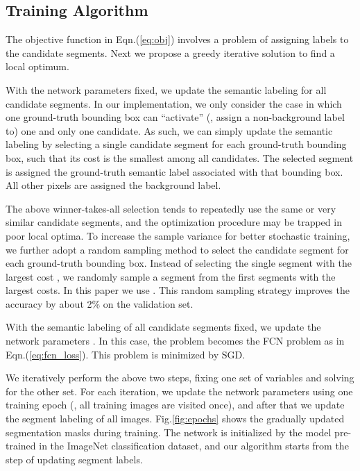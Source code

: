 \documentclass[10pt,twocolumn,letterpaper]{article}
\begin{document}
\subsection{Training Algorithm}
\label{sec:alg}

The objective function in Eqn.(\ref{eq:obj}) involves a problem of assigning labels to the candidate segments. Next we propose a greedy iterative solution to find a local optimum.

With the network parameters  fixed, we update the semantic labeling  for all candidate segments. In our implementation, we only consider the case in which one ground-truth bounding box can ``activate'' (\ie, assign a non-background label to) one and only one candidate. As such, we can simply update the semantic labeling by selecting a single candidate segment for each ground-truth bounding box, such that its cost  is the smallest among all candidates. The selected segment is assigned the ground-truth semantic label associated with that bounding box. All other pixels are assigned the background label.

The above winner-takes-all selection tends to repeatedly use the same or very similar candidate segments, and the optimization procedure may be trapped in poor local optima. To increase the sample variance for better stochastic training, we further adopt a random sampling method to select the candidate segment for each ground-truth bounding box. Instead of selecting the single segment with the largest cost , we randomly sample a segment from the first  segments with the largest costs. In this paper we use . This random sampling strategy improves the accuracy by about 2\% on the validation set.

With the semantic labeling  of all candidate segments fixed, we update the network parameters . In this case, the problem becomes the FCN problem \cite{Long2015} as in Eqn.(\ref{eq:fcn_loss}). This problem is minimized by SGD.

We iteratively perform the above two steps, fixing one set of variables and solving for the other set.
For each iteration, we update the network parameters using one training epoch (\ie, all training images are visited once), and after that we update the segment labeling of all images. Fig.\ref{fig:epochs} shows the gradually updated segmentation masks during training.
The network is initialized by the model pre-trained in the ImageNet classification dataset, and our algorithm starts from the step of updating segment labels.
\end{document}
